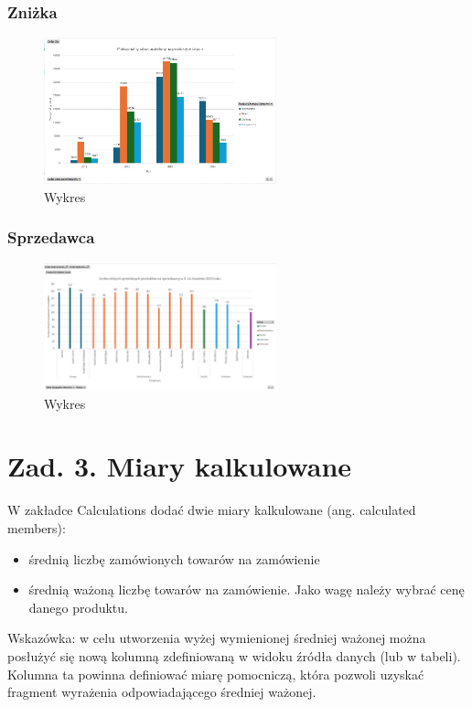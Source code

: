 \documentclass[a4paper,12pt]{article}
\begin{document}
\subsubsection{Zniżka}

\begin{figure}[H]
  \includegraphics[width=0.6\textwidth]{images/max_discount.png}
  \caption{Wykres}
\end{figure}

\subsubsection{Sprzedawca}

\begin{figure}[H]
  \includegraphics[width=0.6\textwidth]{images/sales_salesperson.png}
  \caption{Wykres}
\end{figure}

\section{Zad. 3. Miary kalkulowane}

W zakładce Calculations dodać dwie miary kalkulowane (ang. calculated members):\begin{itemize}
  \item średnią liczbę zamówionych towarów na zamówienie
  \item średnią ważoną liczbę towarów na zamówienie. Jako wagę należy wybrać cenę danego produktu.
\end{itemize}
Wskazówka: w celu utworzenia wyżej wymienionej średniej ważonej można posłużyć się nową
kolumną zdefiniowaną w widoku źródła danych (lub w tabeli). Kolumna ta powinna definiować
miarę pomocniczą, która pozwoli uzyskać fragment wyrażenia odpowiadającego średniej
ważonej.
\end{document}

